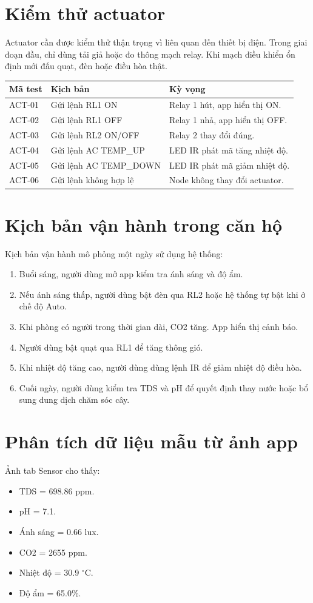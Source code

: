 \section{Kiểm thử actuator}
Actuator cần được kiểm thử thận trọng vì liên quan đến thiết bị điện. Trong giai đoạn đầu, chỉ dùng tải giả hoặc đo thông mạch relay. Khi mạch điều khiển ổn định mới đấu quạt, đèn hoặc điều hòa thật.

\begin{longtable}{|p{3cm}|p{4.5cm}|p{5.5cm}|}
\hline
\textbf{Mã test} & \textbf{Kịch bản} & \textbf{Kỳ vọng} \\
\hline
ACT-01 & Gửi lệnh RL1 ON & Relay 1 hút, app hiển thị ON. \\
\hline
ACT-02 & Gửi lệnh RL1 OFF & Relay 1 nhả, app hiển thị OFF. \\
\hline
ACT-03 & Gửi lệnh RL2 ON/OFF & Relay 2 thay đổi đúng. \\
\hline
ACT-04 & Gửi lệnh AC TEMP\_UP & LED IR phát mã tăng nhiệt độ. \\
\hline
ACT-05 & Gửi lệnh AC TEMP\_DOWN & LED IR phát mã giảm nhiệt độ. \\
\hline
ACT-06 & Gửi lệnh không hợp lệ & Node không thay đổi actuator. \\
\hline
\end{longtable}

\section{Kịch bản vận hành trong căn hộ}
Kịch bản vận hành mô phỏng một ngày sử dụng hệ thống:
\begin{enumerate}
    \item Buổi sáng, người dùng mở app kiểm tra ánh sáng và độ ẩm.
    \item Nếu ánh sáng thấp, người dùng bật đèn qua RL2 hoặc hệ thống tự bật khi ở chế độ Auto.
    \item Khi phòng có người trong thời gian dài, CO2 tăng. App hiển thị cảnh báo.
    \item Người dùng bật quạt qua RL1 để tăng thông gió.
    \item Khi nhiệt độ tăng cao, người dùng dùng lệnh IR để giảm nhiệt độ điều hòa.
    \item Cuối ngày, người dùng kiểm tra TDS và pH để quyết định thay nước hoặc bổ sung dung dịch chăm sóc cây.
\end{enumerate}

\section{Phân tích dữ liệu mẫu từ ảnh app}
Ảnh tab Sensor cho thấy:
\begin{itemize}
    \item TDS = 698.86 ppm.
    \item pH = 7.1.
    \item Ánh sáng = 0.66 lux.
    \item CO2 = 2655 ppm.
    \item Nhiệt độ = 30.9 $^\circ$C.
    \item Độ ẩm = 65.0\%.
\end{itemize}

